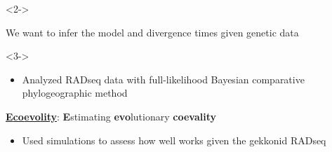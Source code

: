 \begin{frame}
    \vspace{-1mm}

    \begin{minipage}[t][0.45\textheight][t]{\linewidth}
        \begin{onlyenv}<2->
            \begin{center}
                We want to infer the model and divergence times given genetic data
            \end{center}
        \end{onlyenv}

        \begin{onlyenv}<3->
            \begin{itemize}
                \item Analyzed RADseq data with full-likelihood Bayesian comparative phylogeographic method
            \end{itemize}

            \begin{center}
                \LARGE
                \href{https://github.com/phyletica/ecoevolity}{
                    \textbf{\textcolor{pgreen}{E}\textcolor{pteal}{co\textcolor{pauburn}{evo}lity}}}:
                \textcolor{pgreen}{\bf E}stimating \textcolor{pauburn}{\bf evo}lutionary \textcolor{pteal}{\bf coevality}
            \end{center}

            \begin{itemize}
                \item<4-> Used simulations to assess how well \ecoevolity works given
                    the gekkonid RADseq \datasets
            \end{itemize}
        \end{onlyenv}



\end{minipage}
\end{frame}
